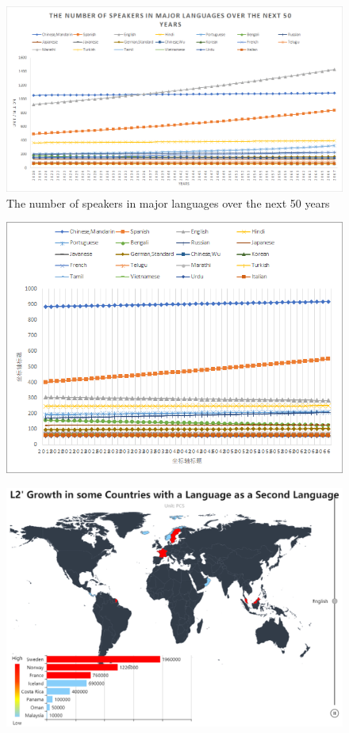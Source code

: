\begin{figure}[H]
	\centering
	\includegraphics[width=1\linewidth]{figures/next50number}
	\caption{The number of speakers in major languages over the next 50 years}
	\label{fig:next50number}
\end{figure}

\begin{figure}[h]
	\centering
	\includegraphics[width=1\linewidth]{figures/percent}
	\caption{}
	\label{fig:percent}
\end{figure}


\begin{figure}[H]
	\centering
	\includegraphics[width=1\linewidth]{figures/english}
	\caption{}
	\label{fig:english}
\end{figure}


